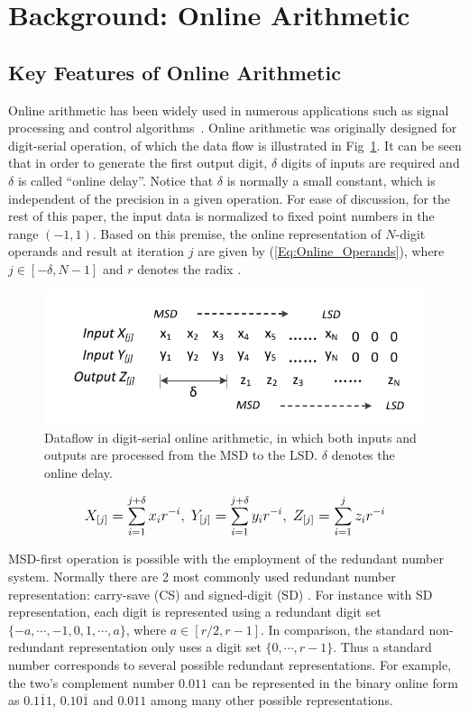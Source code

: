 \documentclass[conference]{IEEEtran}
\begin{document}
\section{Background: Online Arithmetic}\label{Sec:Background}
\subsection{Key Features of Online Arithmetic}

Online arithmetic has been widely used in numerous applications such as signal processing and control algorithms~\cite{Online_FPGADSP,Online_Control}. Online arithmetic was originally designed for digit-serial operation, of which the data flow is illustrated in Fig~\ref{Fig:OnlineDataFlow}. It can be seen that in order to generate the first output digit, $\delta$ digits of inputs are required and $\delta$ is called ``online delay''. Notice that $\delta$ is normally a small constant, which is independent of the precision in a given operation. For ease of discussion, for the rest of this paper, the input data is normalized to fixed point numbers in the range $(-1,1)$. Based on this premise, the online representation of $N$-digit operands and result at iteration $j$ are given by (\ref{Eq:Online_Operands}), where $j\in[-\delta,N-1]$ and $r$ denotes the radix \cite{Ercegovac_Book}.
%
\begin{figure}[tbp]
  \centering
  \includegraphics[width=.48\textwidth]{./Figures/OnlineArithmetic_DataFlow.pdf}
  \vspace{-4ex}
  \caption{Dataflow in digit-serial online arithmetic, in which both inputs and outputs are processed from the MSD to the LSD. $\delta$ denotes the online delay.}
  \vspace{-1ex}
  \label{Fig:OnlineDataFlow}
\end{figure}
%
\begin{eqnarray}\label{Eq:Online_Operands}
\footnotesize
  X_{[j]}=\sum_{i=1}^{j+\delta}x_ir^{-i},~Y_{[j]}=\sum_{i=1}^{j+\delta}y_ir^{-i},~Z_{[j]}=\sum_{i=1}^{j}z_ir^{-i}
\normalsize
\end{eqnarray}

MSD-first operation is possible with the employment of the redundant number system. Normally there are 2 most commonly used redundant number representation: carry-save (CS) \cite{CSadder} and signed-digit (SD) \cite{RedundantNumber}. For instance with SD representation, each digit is represented using a redundant digit set $\{-a, \cdots,-1,0, 1, \cdots, a\}$, where $a\in[r/2,r-1]$. In comparison, the standard non-redundant representation only uses a digit set $\{0,\cdots,r-1\}$. Thus a standard number corresponds to several possible redundant representations. For example, the two's complement number $0.011$ can be represented in the binary online form as $0.1\overline{1}1$, $0.10\overline{1}$ and $0.011$ among many other possible representations.
\end{document}
